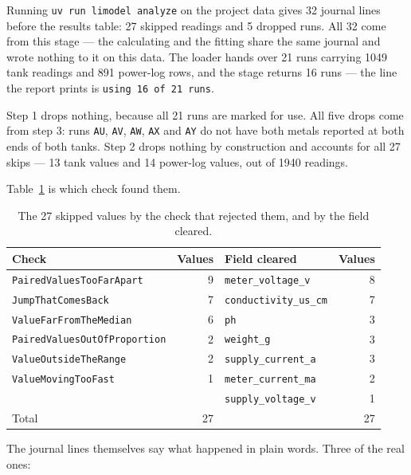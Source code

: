 Running \texttt{uv run limodel analyze} on the project data gives 32 journal lines before the
results table: 27 skipped readings and 5 dropped runs. All 32 come from this stage --- the
calculating and the fitting share the same journal and wrote nothing to it on this data. The
loader hands over 21 runs carrying 1049 tank readings and 891 power-log rows, and the stage
returns 16 runs --- the line the report prints is \texttt{using 16 of 21 runs}.

Step 1 drops nothing, because all 21 runs are marked for use. All five drops come from step 3:
runs \texttt{AU}, \texttt{AV}, \texttt{AW}, \texttt{AX} and \texttt{AY} do not have both metals
reported at both ends of both tanks. Step 2 drops nothing by construction and accounts for all
27 skips --- 13 tank values and 14 power-log values, out of 1940 readings.

Table~\ref{tab:skips-by-check} is which check found them.

\begin{table}[htbp]
  \centering
  \caption{The 27 skipped values by the check that rejected them, and by the field cleared.}
  \label{tab:skips-by-check}
  \begin{tabular}{@{}lrlr@{}}
    \toprule
    Check & Values & Field cleared & Values \\
    \midrule
    \texttt{PairedValuesTooFarApart}     & 9 & \texttt{meter\_voltage\_v}   & 8 \\
    \texttt{JumpThatComesBack}           & 7 & \texttt{conductivity\_us\_cm} & 7 \\
    \texttt{ValueFarFromTheMedian}       & 6 & \texttt{ph}                  & 3 \\
    \texttt{PairedValuesOutOfProportion} & 2 & \texttt{weight\_g}           & 3 \\
    \texttt{ValueOutsideTheRange}        & 2 & \texttt{supply\_current\_a}  & 3 \\
    \texttt{ValueMovingTooFast}          & 1 & \texttt{meter\_current\_ma}  & 2 \\
                                         &   & \texttt{supply\_voltage\_v}  & 1 \\
    \midrule
    Total                                & 27 &                             & 27 \\
    \bottomrule
  \end{tabular}
\end{table}

The journal lines themselves say what happened in plain words. Three of the real ones:

